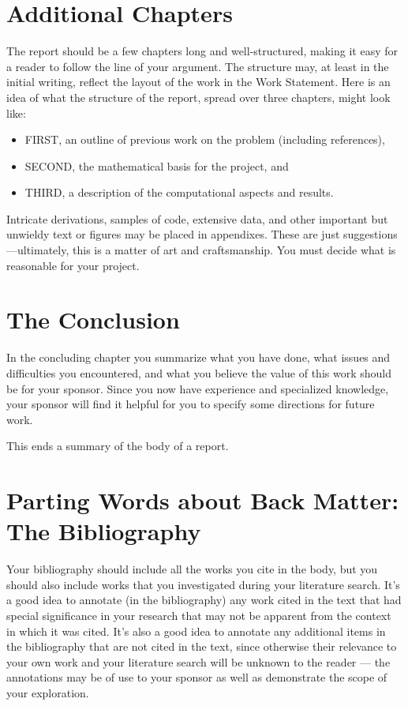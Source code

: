 \section{Additional Chapters}

The report should be a few chapters long and well-structured, making it easy for a reader to follow the line of your argument.
The
structure may, at least in the initial writing, reflect the layout of the work in the Work Statement.
Here is an idea of what the structure of the report, spread over three chapters, might look like:
\begin{itemize}
\item FIRST, an outline of previous work on the problem (including references),
\item SECOND, the mathematical basis for the project, and
\item THIRD, a description of the computational aspects and results.
\end{itemize}
Intricate derivations, samples of code, extensive data, and other important but unwieldy text or figures may be placed in appendixes.
These are just suggestions---ultimately, this is a matter of art and craftsmanship.
You must decide what is reasonable for your project.


\section{The Conclusion}

In the concluding chapter you summarize what you have done, what issues and difficulties you encountered, and what you believe the value of this work should be for your sponsor.
Since you now have experience and specialized knowledge, your sponsor will find it helpful for you to specify some directions for future work.

\vspace{10pt}
\noindent
This ends a summary of the body of a report.

\section{Parting Words about Back Matter: The Bibliography}

Your bibliography should include all the works you cite in the body, but you should also include works that you investigated during your literature search.
It's a good idea to annotate (in the bibliography) any work cited in the text that had special significance in your research that may not be apparent from the context in which it was cited.
It's also a good idea to annotate any additional items in the bibliography that are not cited in the text, since otherwise their relevance to your own work and your literature search will be unknown to the reader  --- the annotations may be of use to your sponsor as well as demonstrate the scope of your exploration.

